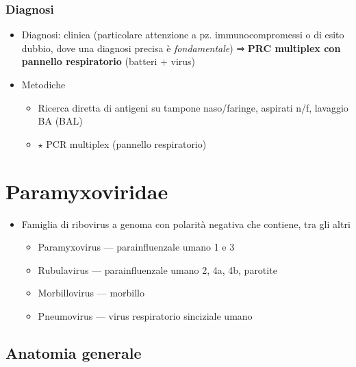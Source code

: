 \documentclass[italian,]{article}
\providecommand{\tightlist}{%
  \setlength{\itemsep}{0pt}\setlength{\parskip}{0pt}}
\newcommand{\goldstandard}{\textcircled{$\star$} }                      %
\begin{document}
\hypertarget{diagnosi-9}{%
\subsubsection{Diagnosi}\label{diagnosi-9}}

\begin{itemize}
\tightlist
\item
  Diagnosi: clinica (particolare attenzione a pz. immunocompromessi o di
  esito dubbio, dove una diagnosi precisa è \emph{fondamentale}) ⇒
  \textbf{PRC multiplex con pannello respiratorio} (batteri + virus)
\item
  Metodiche

  \begin{itemize}
  \tightlist
  \item
    Ricerca diretta di antigeni su tampone naso/faringe, aspirati n/f,
    lavaggio BA (BAL)
  \item
    \goldstandard PCR multiplex (pannello respiratorio)
  \end{itemize}
\end{itemize}

\hypertarget{paramyxoviridae}{%
\section{Paramyxoviridae}\label{paramyxoviridae}}

\begin{itemize}
\tightlist
\item
  Famiglia di ribovirus a genoma con polarità negativa che contiene, tra
  gli altri

  \begin{itemize}
  \tightlist
  \item
    Paramyxovirus --- parainfluenzale umano 1 e 3
  \item
    Rubulavirus --- parainfluenzale umano 2, 4a, 4b, parotite
  \item
    Morbillovirus --- morbillo
  \item
    Pneumovirus --- virus respiratorio sinciziale umano
  \end{itemize}
\end{itemize}

\hypertarget{anatomia-generale}{%
\subsection{Anatomia generale}\label{anatomia-generale}}
\end{document}
